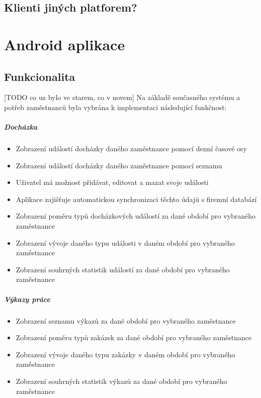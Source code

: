 \documentclass{diplomka}
\begin{document}
\section{Klienti jiných platforem?}

\chapter{Android aplikace}

\section{Funkcionalita}
[TODO co uz bylo ve starem, co v novem]
Na základě současného systému a potřeb zaměstnanců byla vybrána k implementaci následující funkčnost: 

\paragraph{Docházka}
\begin{itemize}[noitemsep,nolistsep]
\item Zobrazení událostí docházky daného zaměstnance pomocí denní časové osy
\item Zobrazení událostí docházky daného zaměstnance pomocí seznamu
\item Uživatel má možnost přidávat, editovat a mazat svoje události
\item Aplikace zajišťuje automatickou synchronizaci těchto údajů s firemní databází
\item Zobrazení poměru typů docházkových událostí za dané období pro vybraného zaměstnance
\item Zobrazení vývoje daného typu události v daném období pro vybraného zaměstnance
\item Zobrazení souhrných statistik událostí za dané období pro vybraného zaměstnance
\end{itemize}

\paragraph{Výkazy práce}
\begin{itemize}[noitemsep,nolistsep]
\item Zobrazení seznamu výkazů za dané období pro vybraného zaměstnance
\item Zobrazení poměru typů zakázek za dané období pro vybraného zaměstnance
\item Zobrazení vývoje daného typu zakázky v daném období pro vybraného zaměstnance
\item Zobrazení souhrných statistik výkazů za dané období pro vybraného zaměstnance
\end{itemize}
\end{document}
